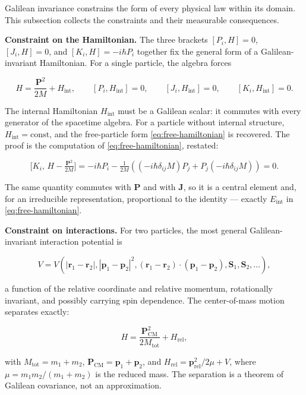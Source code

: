 Galilean invariance constrains the form of every physical law within its domain. This subsection collects the constraints and their measurable consequences.

\medskip\noindent\textbf{Constraint on the Hamiltonian.} The three brackets $[P_i,H]=0$, $[J_i,H]=0$, and $[K_i,H]=-i\hbar P_i$ together fix the general form of a Galilean-invariant Hamiltonian. For a single particle, the algebra forces
\begin{linenomath}
\begin{equation}
H = \frac{\bm P^{2}}{2M} + H_{\mathrm{int}},
\qquad
[P_i,H_{\mathrm{int}}] = 0,\qquad [J_i,H_{\mathrm{int}}] = 0,\qquad [K_i,H_{\mathrm{int}}] = 0.
\label{eq:constrained-hamiltonian}
\end{equation}
\end{linenomath}
The internal Hamiltonian $H_{\mathrm{int}}$ must be a Galilean scalar: it commutes with every generator of the spacetime algebra. For a particle without internal structure, $H_{\mathrm{int}} = \mathrm{const}$, and the free-particle form \eqref{eq:free-hamiltonian} is recovered. The proof is the computation of \eqref{eq:free-hamiltonian}, restated:
\begin{linenomath}
\begin{equation*}
\bigl[K_i,\,H - \tfrac{\bm P^{2}}{2M}\bigr] = -i\hbar P_i - \tfrac{1}{2M}((-i\hbar\delta_{ij}M)P_j + P_j(-i\hbar\delta_{ij}M)) = 0 .
\end{equation*}
\end{linenomath}
The same quantity commutes with $\bm P$ and with $\bm J$, so it is a central element and, for an irreducible representation, proportional to the identity --- exactly $E_{\mathrm{int}}$ in \eqref{eq:free-hamiltonian}.

\medskip\noindent\textbf{Constraint on interactions.} For two particles, the most general Galilean-invariant interaction potential is
\begin{linenomath}
\begin{equation}
V = V(|\bm r_{1} - \bm r_{2}|, |\bm p_{1} - \bm p_{2}|^{2}, (\bm r_{1}-\bm r_{2})\!\cdot\!(\bm p_{1}-\bm p_{2}), \bm S_{1},\bm S_{2}, \ldots),
\label{eq:galilei-potential}
\end{equation}
\end{linenomath}
a function of the relative coordinate and relative momentum, rotationally invariant, and possibly carrying spin dependence. The center-of-mass motion separates exactly:
\begin{linenomath}
\begin{equation}
H = \frac{\bm P_{\mathrm{CM}}^{2}}{2M_{\mathrm{tot}}} + H_{\mathrm{rel}},
\label{eq:cm-separation}
\end{equation}
\end{linenomath}
with $M_{\mathrm{tot}} = m_{1}+m_{2}$, $\bm P_{\mathrm{CM}} = \bm p_{1}+\bm p_{2}$, and $H_{\mathrm{rel}} = \bm p_{\mathrm{rel}}^{2}/2\mu + V$, where $\mu = m_{1}m_{2}/(m_{1}+m_{2})$ is the reduced mass. The separation is a theorem of Galilean covariance, not an approximation.

